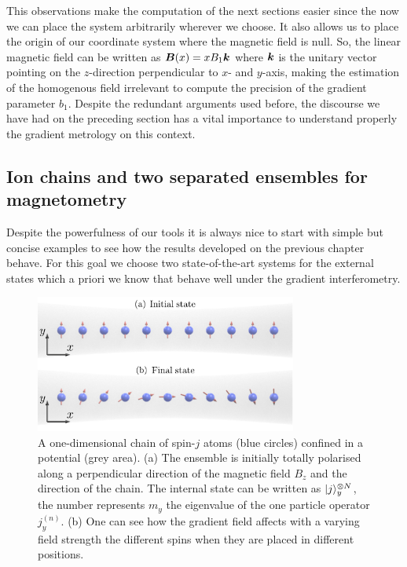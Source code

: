 This observations make the computation of the next sections easier since the now we can place the system arbitrarily wherever we choose.
It also allows us to place the origin of our coordinate system where the magnetic field is null.
So, the linear magnetic field can be written as $\boldsymbol{B}(x)= xB_1\boldsymbol{k}$ where $\boldsymbol{k}$ is the unitary vector pointing on the $z$-direction perpendicular to $x$- and $y$-axis, making the estimation of the homogenous field irrelevant to compute the precision of the gradient parameter $b_1$.
Despite the redundant arguments used before, the discourse we have had on the preceding section has a vital importance to understand properly the gradient metrology on this context.


\subsection{Ion chains and two separated ensembles for magnetometry}
\label{sec:twin cloud systems}

Despite the powerfulness of our tools it is always nice to start with simple but concise examples to see how the results developed on the previous chapter behave.
For this goal we choose two state-of-the-art systems for the external states which a priori we know that behave well under the gradient interferometry.

\begin{figure}[htp]
\begin{center}
\includegraphics[width=244pt]{img/tp-density.pdf}
\caption{A one-dimensional chain of spin-$j$ atoms (blue
circles) confined in a potential (grey area).
(a) The ensemble is initially totally polarised along a
perpendicular direction of the magnetic field $B_z$ and the direction of the chain.
The internal state can be written as $\vert j \rangle_{y}^{\otimes N}$, the number represents $m_y$ the eigenvalue of the one particle operator $j_y^{(n)}$.
(b) One can see how the gradient field affects with a varying field strength the different spins when they are placed in different positions. }
\label{fig:ionchain-evolution}
\end{center}
\end{figure}

